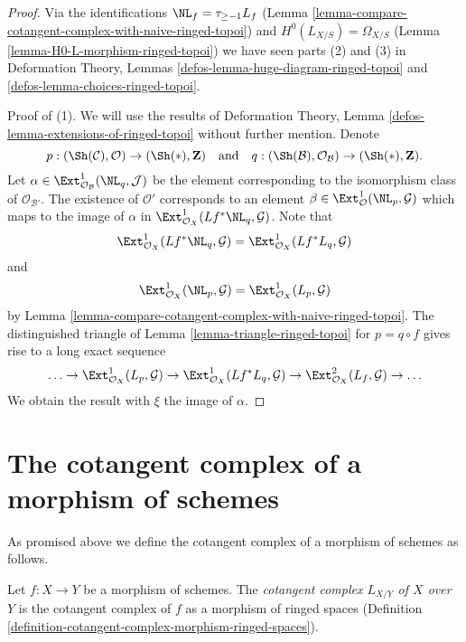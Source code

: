 \begin{proof}
Via the identifications $\NL_f = \tau_{\geq -1}L_f$
(Lemma \ref{lemma-compare-cotangent-complex-with-naive-ringed-topoi}) and
$H^0(L_{X/S}) = \Omega_{X/S}$
(Lemma \ref{lemma-H0-L-morphism-ringed-topoi})
we have seen parts (2) and (3) in
Deformation Theory, Lemmas \ref{defos-lemma-huge-diagram-ringed-topoi} and
\ref{defos-lemma-choices-ringed-topoi}.

\medskip\noindent
Proof of (1). We will use the results of
Deformation Theory, Lemma \ref{defos-lemma-extensions-of-ringed-topoi}
without further mention. Denote
$$
p : (\Sh(\mathcal{C}), \mathcal{O}) \to (\Sh(*), \mathbf{Z})
\quad\text{and}\quad
q : (\Sh(\mathcal{B}), \mathcal{O}_\mathcal{B}) \to (\Sh(*), \mathbf{Z}).
$$
Let $\alpha \in \Ext^1_{\mathcal{O}_\mathcal{B}}(\NL_q, \mathcal{J})$
be the element corresponding to the isomorphism class of
$\mathcal{O}_{\mathcal{B}'}$. The existence of $\mathcal{O}'$
corresponds to an element
$\beta \in \Ext_\mathcal{O}^1(\NL_p, \mathcal{G})$
which maps to the image of $\alpha$ in
$\Ext^1_{\mathcal{O}_X}(Lf^*\NL_q, \mathcal{G})$.
Note that
$$
\Ext^1_{\mathcal{O}_X}(Lf^*\NL_q, \mathcal{G}) =
\Ext^1_{\mathcal{O}_X}(Lf^*L_q, \mathcal{G})
$$
and
$$
\Ext^1_{\mathcal{O}_X}(\NL_p, \mathcal{G}) =
\Ext^1_{\mathcal{O}_X}(L_p, \mathcal{G})
$$
by Lemma \ref{lemma-compare-cotangent-complex-with-naive-ringed-topoi}.
The distinguished triangle of Lemma \ref{lemma-triangle-ringed-topoi}
for $p = q \circ f$ gives rise to a long exact sequence
$$
\ldots \to
\Ext^1_{\mathcal{O}_X}(L_p, \mathcal{G}) \to
\Ext^1_{\mathcal{O}_X}(Lf^*L_q, \mathcal{G}) \to
\Ext^2_{\mathcal{O}_X}(L_f, \mathcal{G}) \to \ldots
$$
We obtain the result with $\xi$ the image of $\alpha$.
\end{proof}












\section{The cotangent complex of a morphism of schemes}
\label{section-cotangent-morphism-schemes}

\noindent
As promised above we define the cotangent complex of a morphism of
schemes as follows.

\begin{definition}
\label{definition-cotangent-morphism-schemes}
Let $f : X \to Y$ be a morphism of schemes. The {\it cotangent complex
$L_{X/Y}$ of $X$ over $Y$} is the cotangent complex of $f$ as a
morphism of ringed spaces
(Definition \ref{definition-cotangent-complex-morphism-ringed-spaces}).
\end{definition}

